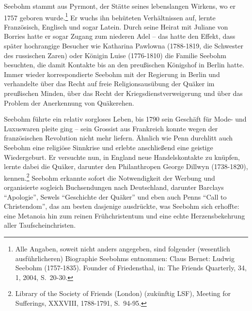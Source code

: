 Seebohm stammt aus Pyrmont, der Stätte seines lebenslangen Wirkens, wo er 1757
geboren wurde.\footnote{Alle Angaben, soweit nicht anders angegeben, sind
folgender (wesentlich
ausführlicheren) Biographie Seebohms entnommen: Claus Bernet: Ludwig Seebohm
(1757-1835). Founder of Friedensthal, in: The Friends Quarterly, 34, 1, 2004,
S.~20-30.} Er wuchs ihn behüteten Verhältnissen auf, lernte Französisch,
Englisch und sogar Latein. Durch seine Heirat mit Juliane von Borries hatte er
sogar Zugang zum niederen Adel -- das hatte den Effekt, dass später hochrangige
Besucher wie Katharina Pawlowna (1788-1819, die Schwester des russischen Zaren)
oder Königin Luise (1776-1810) die Familie Seebohm besuchten, die damit Kontakte
bis an den preußischen Königshof in Berlin hatte. Immer wieder korrespondierte
Seebohm mit der Regierung in Berlin und verhandelte über das Recht auf freie
Religionsausübung der Quäker im preußischen Minden, über das Recht der
Kriegsdienstverweigerung und über das Problem der Anerkennung von Quäkerehen.

\medskip

Seebohm führte ein relativ sorgloses Leben, bis 1790 sein Geschäft für Mode- und
Luxuswaren pleite ging -- sein Grossist aus Frankreich konnte wegen der
französischen Revolution nicht mehr liefern. Ähnlich wie Penn durchlitt auch
Seebohm eine religiöse Sinnkrise und erlebte anschließend eine geistige
Wiedergeburt. Er versuchte nun, in England neue Handelskontakte zu knüpfen,
lernte dabei die Quäker, darunter den Philanthropen George Dillwyn (1738-1820),
kennen.\footnote{Library of the Society of Friends (London) (zukünftig LSF),
Meeting for
Sufferings, XXXVIII, 1788-1791, S.~94-95.} Seebohm erkannte sofort die
Notwendigkeit der Werbung und organisierte sogleich Buchsendungen nach
Deutschland, darunter Barclays "`Apologie"', Sewels "`Geschichte der Quäker"'
und eben auch Penns "`Call to Christendom"', das am besten dasjenige ausdrückte,
was Seebohm sich erhoffte: eine Metanoia hin zum reinen Frühchristentum und eine
echte Herzensbekehrung aller Taufscheinchristen.

\medskip

